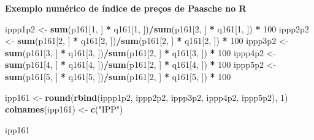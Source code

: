 \documentclass[
]{book}
\newenvironment{Shaded}{\begin{snugshade}}{\end{snugshade}}
\newcommand{\DecValTok}[1]{\textcolor[rgb]{0.00,0.00,0.81}{#1}}
\newcommand{\KeywordTok}[1]{\textcolor[rgb]{0.13,0.29,0.53}{\textbf{#1}}}
\newcommand{\NormalTok}[1]{#1}
\newcommand{\OperatorTok}[1]{\textcolor[rgb]{0.81,0.36,0.00}{\textbf{#1}}}
\newcommand{\StringTok}[1]{\textcolor[rgb]{0.31,0.60,0.02}{#1}}
\begin{document}
\textbf{Exemplo numérico de índice de preços de Paasche no R}

\begin{Shaded}
\begin{Highlighting}[]
\NormalTok{ippp1p2 <-}\StringTok{ }\KeywordTok{sum}\NormalTok{(p161[}\DecValTok{1}\NormalTok{, ] }\OperatorTok{*}\StringTok{ }\NormalTok{q161[}\DecValTok{1}\NormalTok{, ])}\OperatorTok{/}\KeywordTok{sum}\NormalTok{(p161[}\DecValTok{2}\NormalTok{, ] }\OperatorTok{*}\StringTok{ }
\StringTok{    }\NormalTok{q161[}\DecValTok{1}\NormalTok{, ]) }\OperatorTok{*}\StringTok{ }\DecValTok{100}
\NormalTok{ippp2p2 <-}\StringTok{ }\KeywordTok{sum}\NormalTok{(p161[}\DecValTok{2}\NormalTok{, ] }\OperatorTok{*}\StringTok{ }\NormalTok{q161[}\DecValTok{2}\NormalTok{, ])}\OperatorTok{/}\KeywordTok{sum}\NormalTok{(p161[}\DecValTok{2}\NormalTok{, ] }\OperatorTok{*}\StringTok{ }
\StringTok{    }\NormalTok{q161[}\DecValTok{2}\NormalTok{, ]) }\OperatorTok{*}\StringTok{ }\DecValTok{100}
\NormalTok{ippp3p2 <-}\StringTok{ }\KeywordTok{sum}\NormalTok{(p161[}\DecValTok{3}\NormalTok{, ] }\OperatorTok{*}\StringTok{ }\NormalTok{q161[}\DecValTok{3}\NormalTok{, ])}\OperatorTok{/}\KeywordTok{sum}\NormalTok{(p161[}\DecValTok{2}\NormalTok{, ] }\OperatorTok{*}\StringTok{ }
\StringTok{    }\NormalTok{q161[}\DecValTok{3}\NormalTok{, ]) }\OperatorTok{*}\StringTok{ }\DecValTok{100}
\NormalTok{ippp4p2 <-}\StringTok{ }\KeywordTok{sum}\NormalTok{(p161[}\DecValTok{4}\NormalTok{, ] }\OperatorTok{*}\StringTok{ }\NormalTok{q161[}\DecValTok{4}\NormalTok{, ])}\OperatorTok{/}\KeywordTok{sum}\NormalTok{(p161[}\DecValTok{2}\NormalTok{, ] }\OperatorTok{*}\StringTok{ }
\StringTok{    }\NormalTok{q161[}\DecValTok{4}\NormalTok{, ]) }\OperatorTok{*}\StringTok{ }\DecValTok{100}
\NormalTok{ippp5p2 <-}\StringTok{ }\KeywordTok{sum}\NormalTok{(p161[}\DecValTok{5}\NormalTok{, ] }\OperatorTok{*}\StringTok{ }\NormalTok{q161[}\DecValTok{5}\NormalTok{, ])}\OperatorTok{/}\KeywordTok{sum}\NormalTok{(p161[}\DecValTok{2}\NormalTok{, ] }\OperatorTok{*}\StringTok{ }
\StringTok{    }\NormalTok{q161[}\DecValTok{5}\NormalTok{, ]) }\OperatorTok{*}\StringTok{ }\DecValTok{100}

\NormalTok{ipp161 <-}\StringTok{ }\KeywordTok{round}\NormalTok{(}\KeywordTok{rbind}\NormalTok{(ippp1p2, ippp2p2, ippp3p2, ippp4p2, }
\NormalTok{    ippp5p2), }\DecValTok{1}\NormalTok{)}
\KeywordTok{colnames}\NormalTok{(ipp161) <-}\StringTok{ }\KeywordTok{c}\NormalTok{(}\StringTok{"IPP"}\NormalTok{)}

\NormalTok{ipp161}
\end{Highlighting}
\end{Shaded}
\end{document}
